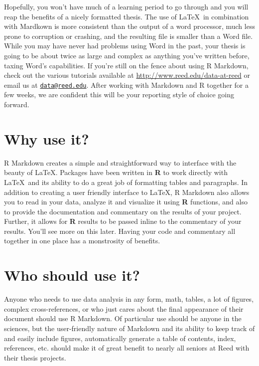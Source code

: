 \documentclass[12pt,twoside]{reedthesis}
\begin{document}
  Hopefully, you won't have much of a learning period to go through and
  you will reap the benefits of a nicely formatted thesis. The use of
  \LaTeX~in combination with Mardkown is more consistent than the output
  of a word processor, much less prone to corruption or crashing, and the
  resulting file is smaller than a Word file. While you may have never had
  problems using Word in the past, your thesis is going to be about twice
  as large and complex as anything you've written before, taxing Word's
  capabilities. If you're still on the fence about using R Markdown, check
  out the various tutorials available at
  \url{http://www.reed.edu/data-at-reed} or email us at
  \href{mailto:data@reed.edu}{\nolinkurl{data@reed.edu}}. After working
  with Markdown and R together for a few weeks, we are confident this will
  be your reporting style of choice going forward.
  
  \section{Why use it?}
  
  R Markdown creates a simple and straightforward way to interface with
  the beauty of \LaTeX. Packages have been written in \textbf{R} to work
  directly with \LaTeX~and its ability to do a great job of formatting
  tables and paragraphs. In addition to creating a user friendly interface
  to \LaTeX, R Markdown also allows you to read in your data, analyze it
  and visualize it using \textbf{R} functions, and also to provide the
  documentation and commentary on the results of your project. Further, it
  allows for \textbf{R} results to be passed inline to the commentary of
  your results. You'll see more on this later. Having your code and
  commentary all together in one place has a monstrosity of benefits.
  
  \section{Who should use it?}
  
  Anyone who needs to use data analysis in any form, math, tables, a lot
  of figures, complex cross-references, or who just cares about the final
  appearance of their document should use R Markdown. Of particular use
  should be anyone in the sciences, but the user-friendly nature of
  Markdown and its ability to keep track of and easily include figures,
  automatically generate a table of contents, index, references, etc.
  should make it of great benefit to nearly all seniors at Reed with their
  thesis projects.
  
\end{document}
